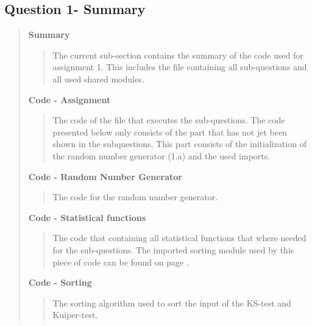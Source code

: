 
\subsection*{\textbf{Question 1- Summary}}
\begin{quote}

\textbf{Summary}
\begin{quote}
The current sub-section contains the summary of the code used for assignment 1. This includes the file  containing all sub-questions and all used shared modules. 
\end{quote}


\textbf{Code - Assignment}

\begin{quote}
The code of the file that executes the sub-questions. The code presented below only consists of the part that has not jet been shown in the subquestions.  This part consists of the initialization of the random number generator (1.a) and the used imports. 
\label{CODE:MAIN1}

\end{quote}

\textbf{Code - Random Number Generator} \\
\begin{quote}
The code for the random number generator.
\label{CODE:RNG}

\end{quote}

\textbf{Code - Statistical functions} \\

\begin{quote}
The code that containing all statistical functions that where needed for the sub-questions. The imported sorting module used by this piece of code can be found on page \pageref{CODE:Sorting}. 
\label{CODE:Statistics}


\end{quote}

\textbf{Code - Sorting} \\

\begin{quote}
The sorting algorithm used to sort the input of the KS-test and Kuiper-test.

\label{CODE:Sorting}
\end{quote}
\end{quote}

\newpage

%


